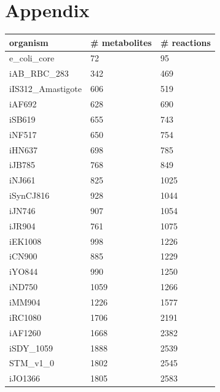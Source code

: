 \newpage
\section*{Appendix}
\setlength{\footskip}{35pt}

\begin{table}[!ht]
    \centering
    \begin{tabular}{lll}
    \hline
        \textbf{organism} & \textbf{\# metabolites} & \textbf{\# reactions} \\ \hline
        e\_coli\_core & 72 & 95 \\ \hline
        iAB\_RBC\_283 & 342 & 469 \\ \hline
        iIS312\_Amastigote & 606 & 519 \\ \hline
        iAF692 & 628 & 690 \\ \hline
        iSB619 & 655 & 743 \\ \hline
        iNF517 & 650 & 754 \\ \hline
        iHN637 & 698 & 785 \\ \hline
        iJB785 & 768 & 849 \\ \hline
        iNJ661 & 825 & 1025 \\ \hline
        iSynCJ816 & 928 & 1044 \\ \hline
        iJN746 & 907 & 1054 \\ \hline
        iJR904 & 761 & 1075 \\ \hline
        iEK1008 & 998 & 1226 \\ \hline
        iCN900 & 885 & 1229 \\ \hline
        iYO844 & 990 & 1250 \\ \hline
        iND750 & 1059 & 1266 \\ \hline
        iMM904 & 1226 & 1577 \\ \hline
        iRC1080 & 1706 & 2191 \\ \hline
        iAF1260 & 1668 & 2382 \\ \hline
        iSDY\_1059 & 1888 & 2539 \\ \hline
        STM\_v1\_0 & 1802 & 2545 \\ \hline
        iJO1366 & 1805 & 2583 \\ \hline

\end{tabular}
\end{table}
